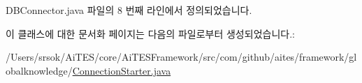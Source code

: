 D\+B\+Connector.\+java 파일의 8 번째 라인에서 정의되었습니다.



이 클래스에 대한 문서화 페이지는 다음의 파일로부터 생성되었습니다.\+:\begin{DoxyCompactItemize}
\item 
/\+Users/srsok/\+Ai\+T\+E\+S/core/\+Ai\+T\+E\+S\+Framework/src/com/github/aites/framework/globalknowledge/\mbox{\hyperlink{_connection_starter_8java}{Connection\+Starter.\+java}}\end{DoxyCompactItemize}
